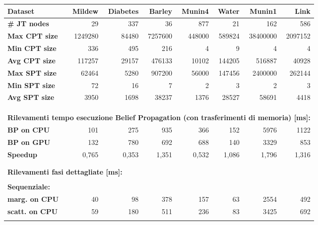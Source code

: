 \documentclass[a4paper]{article}   %
\begin{document}
\begin{table}
\small
\centering
\begin{tabular}{ l | r | r | r | r | r | r | r }
\textbf{Dataset} & \textbf{Mildew} & \textbf{Diabetes} & \textbf{Barley} & \textbf{Munin4} & \textbf{Water} & \textbf{Munin1} & \textbf{Link} \\
  \hline
\textbf{\# JT nodes} & 29 & 337 & 36 &  877 & 21 & 162 & 586 \\
  \hline
\textbf{Max CPT size} & 1249280 & 84480 & 7257600  & 448000 & 589824 & 38400000 & 2097152 \\
\hline
\textbf{Min CPT size} & 336 &	495 &	216 &		4	& 9	&	4	& 4 \\

\hline
\textbf{Avg CPT size} & 117257 &	29157 &	476133 &	10102 &	144205	&	516887 &	40928 \\
  \hline
\textbf{Max SPT size} & 62464	& 5280 &	907200 &		56000 &	147456 &		2400000 &	262144 \\
\hline
\textbf{Min SPT size} & 72	& 16 &	7	&	2 &	3	&	2 &	3 \\
\hline
\textbf{Avg SPT size}  & 3950 &	1698	& 38237	&	1376	& 28527 &		58691 &	4418 \\
 \\
\multicolumn{8}{l}{ }	\\
\multicolumn{8}{l}{ }	\\								

\multicolumn{8}{l}{ \textbf{Rilevamenti tempo esecuzione Belief Propagation (con trasferimenti di memoria) [ms]:}}	\\		
\hline
\textbf{BP on CPU} & 101 &	275 &	935	&	366 &	152	&	5976 &	1122 \\
\hline
\textbf{BP on GPU} & 132 &	780 &	692	&		688 &	140	&	3329 &	853 \\
\hline
\textbf{Speedup} & 0,765 &	0,353 &	1,351	&	0,532 &	1,086	&	1,796 &	1,316 \\
\multicolumn{8}{l}{ }	\\	
\multicolumn{8}{l}{ }	\\								

\multicolumn{8}{l}{\textbf{Rilevamenti fasi dettagliate [ms]:}} \\
\multicolumn{8}{l}{ }	\\								
\multicolumn{8}{l}{\textbf{Sequenziale:}} \\
\hline
\textbf{marg. on CPU} &	40 & 	98 &	378 &		157 &	63	&	2554 &	492 \\
\hline
\textbf{scatt. on CPU} &	59 &	180 &	511	 &		236 &	83 &		3425 &	692 \\
\multicolumn{8}{l}{ }	\\								


\end{tabular}
\end{table}
\end{document}

